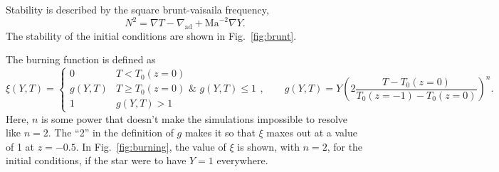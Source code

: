 \documentclass[onecolumn, amsmath, amsfonts, amssymb]{aastex62}
\newcommand{\grad}{\ensuremath{\nabla}}
\begin{document}
Stability is described by the square brunt-vaisaila frequency,
$$
N^2 = \grad T - \grad_{\text{ad}} + \mathrm{Ma}^{-2}\grad Y.
$$
The stability of the initial conditions are shown in Fig.~\ref{fig:brunt}.


The burning function is defined as
\begin{equation}
\xi(Y, T) = 
\begin{cases}
0									& T < T_0(z=0)\\
g(Y, T)								& T \geq T_0(z=0) \,\,\&\,\, g(Y, T) \leq 1 \\
1									& g(Y, T) > 1
\end{cases},
\qquad
g(Y, T) = Y \left(2\frac{T - T_{0}(z=0)}{T_0(z=-1) - T_0(z=0)}\right)^n.
\label{eqn:burning}
\end{equation}
Here, $n$ is some power that doesn't make the simulations impossible to resolve like $n = 2$.
The ``2'' in the definition of $g$ makes it so that $\xi$ maxes out at a value of 1 at $z = -0.5$.
In Fig.~\ref{fig:burning}, the value of $\xi$ is shown, with $n = 2$, for the initial conditions, if the star were to have $Y = 1$ everywhere.
\end{document}
